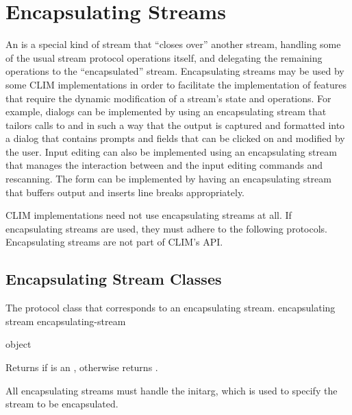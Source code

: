 
\chapter {Encapsulating Streams}
\label {encapsulating-streams}

An  is a special kind of stream that ``closes
over'' another stream, handling some of the usual stream protocol operations
itself, and delegating the remaining operations to the ``encapsulated'' stream.
Encapsulating streams may be used by some CLIM implementations in order to
facilitate the implementation of features that require the dynamic modification
of a stream's state and operations.  For example,  dialogs
can be implemented by using an encapsulating stream that tailors calls to
 and  in such a way that the output is captured
and formatted into a dialog that contains prompts and fields that can be clicked
on and modified by the user.  Input editing can also be implemented using an
encapsulating stream that manages the interaction between  and
the input editing commands and rescanning.  The form  can be
implemented by having an encapsulating stream that buffers output and inserts
line breaks appropriately.

CLIM implementations need not use encapsulating streams at all.  If
encapsulating streams are used, they must adhere to the following protocols.
Encapsulating streams are not part of CLIM's API.

\section {Encapsulating Stream Classes}


The protocol class that corresponds to an encapsulating stream.
 {encapsulating stream} {encapsulating-stream}
\Mutable

 {object}

Returns  if  is an , otherwise
returns .  


All encapsulating streams must handle the  initarg, which is used to
specify the stream to be encapsulated.

